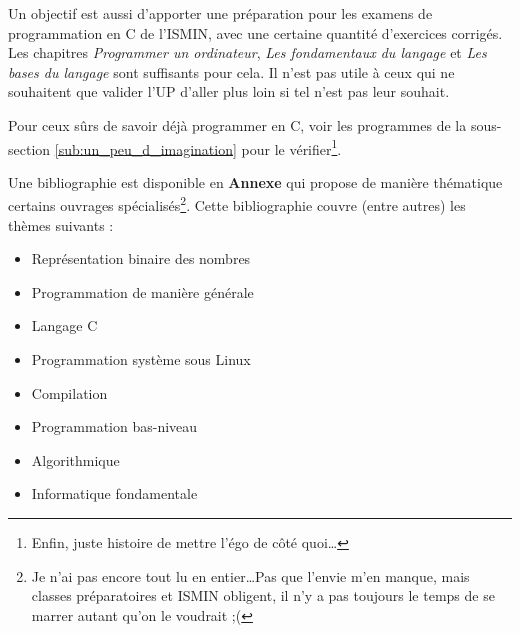 \documentclass[../main.tex]{subfiles}
\begin{document}
Un objectif est aussi d'apporter une préparation pour les examens de programmation en C de l'ISMIN, avec une certaine quantité d'exercices corrigés. Les chapitres \textit{Programmer un ordinateur}, \textit{Les fondamentaux du langage} et \textit{Les bases du langage} sont suffisants pour cela. Il n'est pas utile à ceux qui ne souhaitent que valider l'UP d'aller plus loin si tel n'est pas leur souhait.

Pour ceux sûrs de savoir déjà programmer en C, voir les programmes de la sous-section \ref{sub:un_peu_d_imagination} pour le vérifier\footnote{Enfin, juste histoire de mettre l'égo de côté quoi\dots}.


\hrulefill

Une bibliographie est disponible en \textbf{Annexe} qui propose de manière thématique certains ouvrages spécialisés\footnote{Je n'ai pas encore tout lu en entier\dots Pas que l'envie m'en manque, mais classes préparatoires et ISMIN obligent, il n'y a pas toujours le temps de se marrer autant qu'on le voudrait ;(}. Cette bibliographie couvre (entre autres) les thèmes suivants :
\begin{itemize}
	\item Représentation binaire des nombres \cite{MullerEtAl2018}\cite{BitHacks}
	\item Programmation de manière générale \cite{EoP}
	\item Langage C \cite{KR}\cite{MSRC}\cite{c11}
	\item Programmation système sous Linux \cite{LPI}
	\item Compilation \cite{gnumake}\cite{LL}\cite{AL}\cite{Aho}
	\item Programmation bas-niveau \cite{CSaPP}
	\item Algorithmique \cite{EltAlgorithmie}\cite{TAOCP}
	\item Informatique fondamentale \cite{ONotation}\cite{XFI}
\end{itemize}
\end{document}
